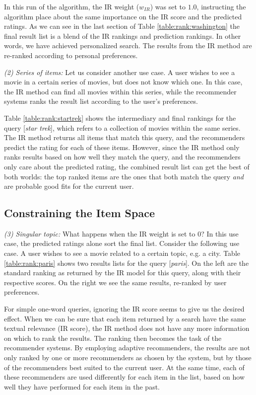 In this run of the algorithm, the IR weight ($w_{IR}$) was set to $1.0$,
instructing the algorithm place about the same importance on the IR score
and the predicted ratings. As we can see in the last section of 
Table \ref{table:rank:washington} the final result list is a blend
of the IR rankings and prediction rankings.
In other words, we have achieved personalized search. The results
from the IR method are re-ranked according to personal preferences.


\emph{(2) Series of items:} Let us consider another use case.
A user wishes to see a movie in a certain series of movies,
but does not know which one. In this case, the IR method can find all movies within this series,
while the recommender systems ranks the result list according to the user's preferences.

Table \ref{table:rank:startrek} shows the intermediary and final rankings
for the query [\emph{star trek}], which refers to a collection of movies within the same series.
The IR method returns all items that match this query,
and the recommenders predict the rating for each of these items.
However, since the IR method only ranks results based on how well they match the query,
and the recommenders only care about the predicted rating, the combined result
list can get the best of both worlds:
the top ranked items are the ones that both match the query \emph{and}
are probable good fits for the current user.


\subsection{Constraining the Item Space}

\emph{(3) Singular topic:} What happens when the IR weight is set to $0$?
In this use case, the predicted ratings alone sort the final list.
Consider the following use case.
A user wishes to see a movie related to a certain topic, e.g. a city.
Table \ref{table:rank:paris} shows two results lists for the query [\emph{paris}].
On the left are the standard ranking as returned by the IR model for this query,
along with their respective scores.
On the right we see the same results, re-ranked by user preferences.

For simple one-word queries, ignoring the IR score seems to give us the desired effect.
When we can be sure that each item returned by a search have the same textual relevance
(IR score), the IR method does not have any more information on which to rank
the results. The ranking then becomes the task of the recommender systems.
By employing adaptive recommenders, the results are not only ranked by 
one or more recommenders as chosen by the system, but by those of the recommenders
best suited to the current user. At the same time, each of these recommenders
are used differently for each item in the list, based on how well they have
performed for each item in the past.

